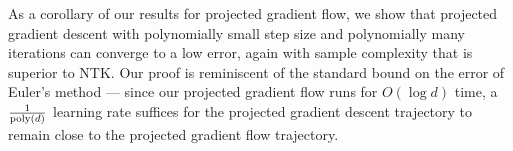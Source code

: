 As a corollary of our results for projected gradient flow, we show that projected gradient descent with polynomially small step size and polynomially many iterations can converge to a low error, again with sample complexity that is superior to NTK. Our proof is reminiscent of the standard bound on the error of Euler's method --- since our projected gradient flow runs for $O(\log d)$ time, a $\frac{1}{\textup{poly}(d)}$ learning rate suffices for the projected gradient descent trajectory to remain close to the projected gradient flow trajectory.